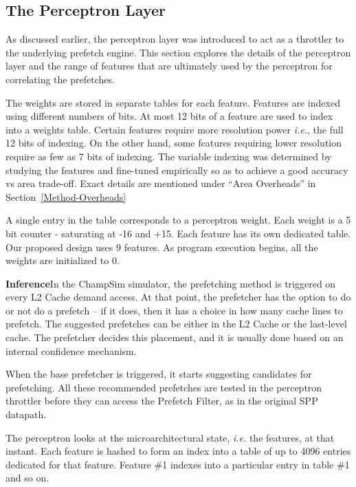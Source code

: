 \subsection{The Perceptron Layer}
\label{Design-Perceptron}
As discussed earlier, the perceptron layer was introduced to act as a
throttler to the underlying prefetch engine.  This section explores the
details of the perceptron layer and the range of features that are ultimately
used by the perceptron for correlating the prefetches.

The weights are stored in separate tables for each
feature.  Features are indexed using different numbers
of bits.  At most 12 bits of a feature are used to index into a
weights table.  Certain features require more resolution power
\textit{i.e.}, the full 12 bits of indexing.  On the other hand, some
features requiring lower resolution require as few as 7 bits of
indexing.  The variable indexing was determined by studying the
features and fine-tuned empirically so as to achieve a good accuracy
vs area trade-off.  Exact details are mentioned under ``Area Overheads''
in Section~\ref{Method-Overheads}

A single entry in the table corresponds to a perceptron weight.  Each
weight is a 5 bit counter - saturating at -16 and +15.  Each feature
has its own dedicated table.  Our proposed design uses 9 features.
As program execution begins, all the weights are initialized to 0.

\textbf{Inference}\newline In the ChampSim simulator, the prefetching method
is triggered on every L2 Cache demand access.  At that point, the prefetcher
has the option to do or not do a prefetch -- if it does, then it has a choice
in how many cache lines to prefetch.  The suggested prefetches can be either
in the L2 Cache or the last-level cache.  The prefetcher decides this
placement, and it is usually done based on an internal confidence mechanism.

When the base prefetcher is triggered, it starts suggesting candidates for
prefetching.  All these recommended prefetches are tested in the perceptron
throttler before they can access the Prefetch Filter, as in the original SPP
datapath.

The perceptron looks at the microarchitectural state, {\em i.e.} the features,
at that instant.  Each feature is hashed to form an index into a table of up to 
4096 entries dedicated for that feature.  
Feature \#1 indexes into
a particular entry in table \#1 and so on.

